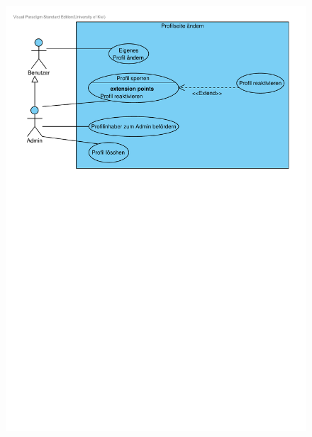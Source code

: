 \documentclass[10pt,a4paper]{article}
\begin{document}
	\begin{figure}[h!]
		\includegraphics[width=\linewidth]{gfx/webseite/Profilseite.pdf}
	\end{figure}
\end{document}
